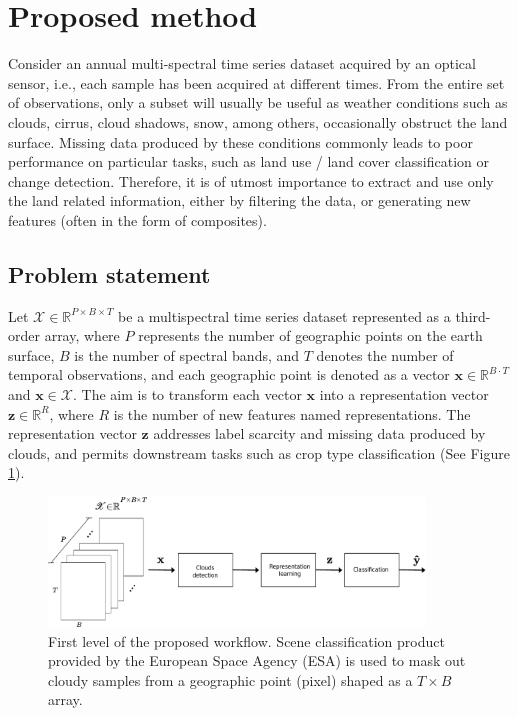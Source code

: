 \documentclass[journal,article,submit,pdftex,moreauthors]{Definitions/mdpi}
\providecommand{\DIFadd}[1]{{\protect\color{blue}\uwave{#1}}} %
\providecommand{\DIFaddFL}[1]{\DIFadd{#1}} %
\providecommand{\DIFaddbeginFL}{} %
\providecommand{\DIFaddendFL}{} %
\begin{document}
\section{Proposed method}
Consider an annual multi-spectral time series dataset acquired by an optical sensor, i.e., each sample has been acquired at different times. From the entire set of observations, only a subset will usually be useful as weather conditions such as clouds, cirrus, cloud shadows, snow, among others, occasionally obstruct the land surface. 
Missing data produced by these conditions commonly leads to poor performance on particular tasks, such as land use / land cover classification or change detection.
Therefore, it is of utmost importance to extract and  use only the land related information, either by filtering the data, or generating new features (often in the form of composites).

\subsection{Problem statement}
Let $\mathscr{X} \in \mathbb{R}^{P \times B \times T}$ be a multispectral time series dataset represented as a third-order array, where $P$ represents the number of geographic points on the earth surface, $B$ is the number of spectral bands, and $T$ denotes the number of temporal observations, and each geographic point is denoted as a vector $\mathbf{x} \in \mathbb{R}^{B \cdot T}$ and $\mathbf{x} \in \mathscr{X}$. The aim is to transform each vector $\mathbf{x}$ into a representation vector $\mathbf{z} \in \mathbb{R}^{R}$, where $R$ is the number of new features named representations. The representation vector $\mathbf{z}$ addresses label scarcity and missing data produced by clouds, and permits downstream tasks such as crop type classification (See Figure \ref{bigpicture}).

\begin{figure}[H]
	\centering
	\includegraphics[width=10cm]{figures/bigpicture_with_clement.pdf}
	\caption{First level of the proposed workflow. Scene classification product provided by the European Space Agency (ESA) is used to mask out cloudy samples from a geographic point (pixel) shaped as a $T \times B$ array. 
\DIFaddbeginFL \DIFaddFL{Figure 3.    }\DIFaddendFL }
	\label{bigpicture}
	\centering
\end{figure}
\end{document}
